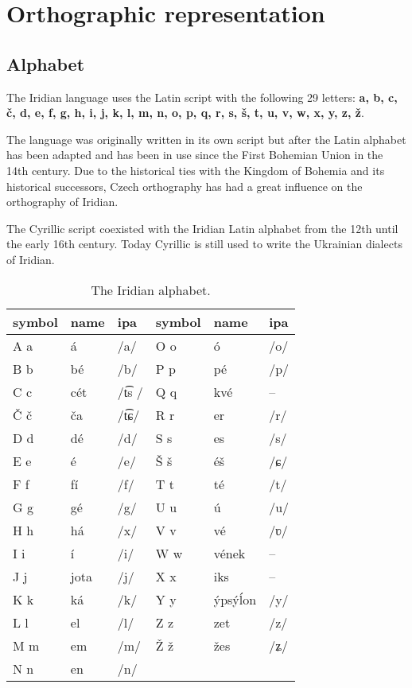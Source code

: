 \section{Orthographic representation}\label{sec:ortho}
\subsection{Alphabet}

\par The Iridian language uses the Latin script with the following 29 letters: \textbf{a, b, c, č, d, e, f, g, h, i, j, k, l, m, n, o, p, q, r, s, š, t, u, v, w, x, y, z, ž}.

The language was originally written in its own script but after the Latin alphabet has been adapted and has been in use since the First Bohemian Union in the 14th century. Due to the historical ties with the Kingdom of Bohemia and its historical successors, Czech orthography has had a great influence on the orthography of Iridian.

The Cyrillic script coexisted with the Iridian Latin alphabet from the 12th until the early 16th century. Today Cyrillic is still used to write the Ukrainian dialects of Iridian.

\begin{table}
	\footnotesize\sffamily
 	\caption{The Iridian alphabet.}
	\medskip
	\begin{tabu}to 0.9 
		\toprule
		{{\sc  symbol}} & {\sc name} & {\sc ipa} & {{\sc  symbol}} & {\sc name} & {\sc ipa}\\
		\midrule
		A a	  	& á 		& /a/				& O o 	& ó 				& /o/\\
		B b			& bé	& /b/				& P p		& pé				& /p/\\
		C c			& cét & /t͡s /		& Q q		& kvé				& --\\
		Č č			& ča		& /t͡ɕ/			& R r		& er					& /r/\\
		D d			& dé	& /d/				& S s		& es					& /s/\\
		E e			& é		& /e/				& Š š		& éš 				& /ɕ/\\
		F f			& fí	& /f/				& T t		& té				& /t/\\
		G g			& gé 	& /g/				& U u 	& ú					& /u/\\
		H h			& há 		& /x/				& V v 	& vé 				& /ʋ/\\
		I i			& í 		& /i/				& W w		& vének				& --\\
		J j			& jota	& /j/				& X x		& iks 				& --\\
		K k 		& ká 		& /k/				& Y y		& ýpsý\'lon		& /y/\\
		L l 		& el 		& /l/				& Z z		& zet 				& /z/\\
		M m			& em 		& /m/				& \v{Z} \v{z}		& žes 				& /ʑ/ \\
		N n			& en		& /n/				&				&							&	\\
		\bottomrule
	\end{tabu}
\end{table}


